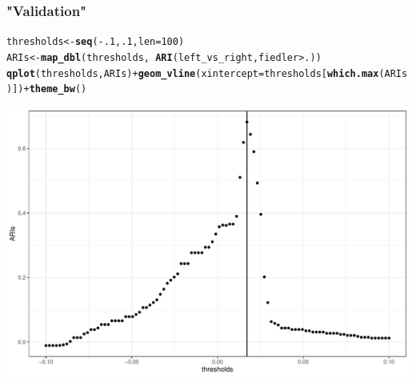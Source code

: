 \documentclass{beamer}\usepackage[]{graphicx}\usepackage[]{color}
\makeatletter
\newcommand{\hlnum}[1]{\textcolor[rgb]{0.686,0.059,0.569}{#1}}%
\newcommand{\hlopt}[1]{\textcolor[rgb]{0,0,0}{#1}}%
\newcommand{\hlstd}[1]{\textcolor[rgb]{0.345,0.345,0.345}{#1}}%
\newcommand{\hlkwb}[1]{\textcolor[rgb]{0.69,0.353,0.396}{#1}}%
\newcommand{\hlkwc}[1]{\textcolor[rgb]{0.333,0.667,0.333}{#1}}%
\newcommand{\hlkwd}[1]{\textcolor[rgb]{0.737,0.353,0.396}{\textbf{#1}}}%
\newenvironment{kframe}{%
 \def\at@end@of@kframe{}%
 \ifinner\ifhmode%
  \def\at@end@of@kframe{\end{minipage}}%
  \begin{minipage}{\columnwidth}%
 \fi\fi%
 \def\FrameCommand##1{\hskip\@totalleftmargin \hskip-\fboxsep
 \colorbox{shadecolor}{##1}\hskip-\fboxsep
     \hskip-\linewidth \hskip-\@totalleftmargin \hskip\columnwidth}%
 \MakeFramed {\advance\hsize-\width
   \@totalleftmargin\z@ \linewidth\hsize
   \@setminipage}}%
 {\par\unskip\endMakeFramed%
 \at@end@of@kframe}
\newenvironment{knitrout}{}{} %
\makeatother
\begin{document}
\begin{frame}[fragile]
  \frametitle{"Validation"}

\begin{knitrout}\scriptsize
{}\color{fgcolor}\begin{kframe}
\begin{alltt}
\hlstd{thresholds} \hlkwb{<-} \hlkwd{seq}\hlstd{(}\hlopt{-}\hlnum{.1}\hlstd{,} \hlnum{.1}\hlstd{,} \hlkwc{len} \hlstd{=} \hlnum{100}\hlstd{)}
\hlstd{ARIs} \hlkwb{<-} \hlkwd{map_dbl}\hlstd{(thresholds,} \hlopt{~}\hlkwd{ARI}\hlstd{(left_vs_right, fiedler} \hlopt{>} \hlstd{.))}
\hlkwd{qplot}\hlstd{(thresholds, ARIs)} \hlopt{+} \hlkwd{geom_vline}\hlstd{(}\hlkwc{xintercept} \hlstd{= thresholds[}\hlkwd{which.max}\hlstd{(ARIs)])} \hlopt{+} \hlkwd{theme_bw}\hlstd{()}
\end{alltt}
\end{kframe}
\includegraphics[width=.8\textwidth]{figures/unnamed-chunk-6-1} 
\end{knitrout}

\end{frame}
\end{document}

